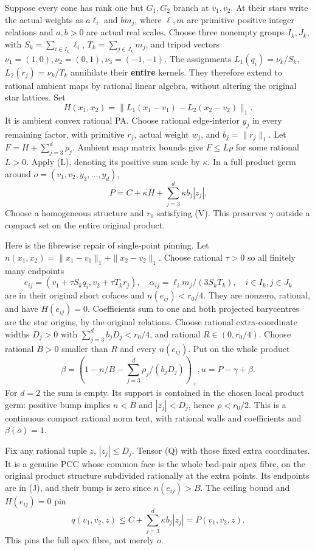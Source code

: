 \documentclass[
  11pt,
]{article}
\begin{document}
Suppose every cone has rank one but \(G_1,G_2\) branch at \(v_1,v_2\).
At their stars write the actual weights as \(a\ell_i\) and \(b m_j\),
where \(\ell,m\) are primitive positive integer relations and \(a,b>0\)
are actual real scales. Choose three nonempty groups \(I_k,J_k\), with
\(S_k=\sum_{i\in I_k}\ell_i\), \(T_k=\sum_{j\in J_k}m_j\), and tripod
vectors \(\nu_1=(1,0),\nu_2=(0,1),\nu_3=(-1,-1)\). The assignments
\(L_1(q_i)=\nu_k/S_k\), \(L_2(r_j)=\nu_k/T_k\) annihilate their
\textbf{entire} kernels. They therefore extend to rational ambient maps
by rational linear algebra, without altering the original star lattices.
Set \[
 H(x_1,x_2)=\|L_1(x_1-v_1)-L_2(x_2-v_2)\|_1.
\] It is ambient convex rational PA. Choose rational edge-interior
\(y_j\) in every remaining factor, with primitive \(r_j\), actual weight
\(w_j\), and \(b_j=\|r_j\|_1\). Let \(F=H+\sum_{j=3}^d\rho_j\). Ambient
map matrix bounds give \(F\leq L\rho\) for some rational \(L>0\). Apply
(L), denoting its positive sum scale by \(\kappa\). In a full product
germ around \(o=(v_1,v_2,y_3,\ldots,y_d)\), \[
                    P=C+\kappa H+\sum_{j=3}^d\kappa b_j|z_j|.
 \tag{J}
\] Choose a homogeneous structure and \(r_0\) satisfying (V). This
preserves \(\gamma\) outside a compact set on the entire original
product.

Here is the fibrewise repair of single-point pinning. Let
\(n(x_1,x_2)=\|x_1-v_1\|_1+\|x_2-v_2\|_1\). Choose rational \(\tau>0\)
so all finitely many endpoints \[
 e_{ij}=(v_1+\tau S_kq_i,v_2+\tau T_kr_j),\quad
 \alpha_{ij}=\ell_i m_j/(3S_kT_k),\quad i\in I_k,j\in J_k
 \tag{Q}
\] are in their original short cofaces and \(n(e_{ij})<r_0/4\). They are
nonzero, rational, and have \(H(e_{ij})=0\). Coefficients sum to one and
both projected barycentres are the star origins, by the original
relations. Choose rational extra-coordinate widths \(D_j>0\) with
\(\sum_{j=3}^db_jD_j<r_0/4\), and rational \(R\in(0,r_0/4)\). Choose
rational \(B>0\) smaller than \(R\) and every \(n(e_{ij})\). Put on the
whole product \[
        \beta=(1-n/B-\sum_{j=3}^d\rho_j/(b_jD_j))_+,
                    u=P-\gamma+\beta.
 \tag{K}
\] For \(d=2\) the sum is empty. Its support is contained in the chosen
local product germ: positive bump implies \(n<B\) and \(|z_j|<D_j\),
hence \(\rho<r_0/2\). This is a continuous compact rational norm tent,
with rational walls and coefficients and \(\beta(o)=1\).

Fix any rational tuple \(z\), \(|z_j|\leq D_j\). Tensor (Q) with those
fixed extra coordinates. It is a genuine PCC whose common face is the
whole bad-pair apex fibre, on the original product structure subdivided
rationally at the extra points. Its endpoints are in (J), and their bump
is zero since \(n(e_{ij})>B\). The ceiling bound and \(H(e_{ij})=0\) pin
\[
                  q(v_1,v_2,z)\leq C+\sum_{j=3}^d\kappa b_j|z_j|
                         =P(v_1,v_2,z).
 \tag{AP}
\] This pins the full apex fibre, not merely \(o\).
\end{document}
